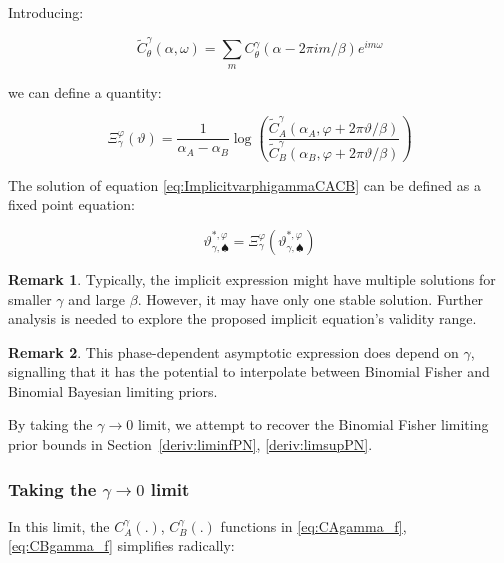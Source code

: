 \documentclass{article}
\theoremstyle{definition}
\newtheorem*{remark}{Remark}
\begin{document}
Introducing:

\begin{equation}
\label{eq:CtildeAB}
    \widetilde{C}^\gamma_\theta(\alpha,\omega) = 
    \sum_m C^\gamma_\theta(\alpha - 2 \pi i m/\beta) e^{i m \omega}
\end{equation}

we can define a quantity:

\begin{equation}
    \Xi_\gamma^\varphi(\vartheta) =
    \frac{1}{\alpha_A - \alpha_B} \log \left (
    \frac{
    \widetilde{C}^\gamma_A(\alpha_A,\varphi + 2 \pi \vartheta / \beta )
    }
    {
    \widetilde{C}^\gamma_B(\alpha_B,\varphi + 2 \pi \vartheta / \beta )
    }
    \right )
\end{equation}

The solution of equation \eqref{eq:ImplicitvarphigammaCACB} can be defined as a fixed point equation:

\begin{equation}
\boxed{
    \vartheta^{*,\varphi}_{\gamma,\spadesuit} = 
    \Xi_\gamma^\varphi(\vartheta^{*,\varphi}_{\gamma,\spadesuit})
    }
\end{equation}

\begin{remark}
    Typically, the implicit expression might have multiple solutions for smaller $\gamma$ and large $\beta$.
    However, it may have only one stable solution.
    Further analysis is needed to explore the proposed implicit equation's validity range.

\end{remark}

\begin{remark}
    This phase-dependent asymptotic expression does depend on $\gamma$, signalling that it has the potential to interpolate between Binomial Fisher and Binomial Bayesian limiting priors.
    
\end{remark}

By taking the $\gamma \to 0$ limit, we attempt to recover the Binomial Fisher limiting prior bounds in Section~\ref{deriv:liminfPN}, \ref{deriv:limsupPN}.

\subsubsection{Taking the $\gamma \to 0$ limit}

In this limit, the $C^\gamma_A(.)$, $C^\gamma_B(.)$ functions in \eqref{eq:CAgamma_f}, \eqref{eq:CBgamma_f} simplifies radically:
\end{document}

